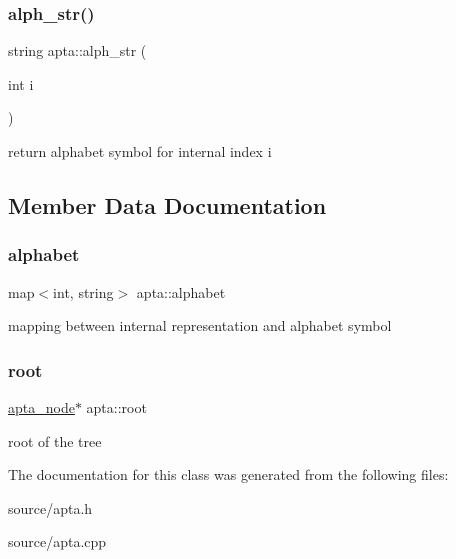 \subsubsection{\texorpdfstring{alph\+\_\+str()}{alph\_str()}}
{\footnotesize\ttfamily string apta\+::alph\+\_\+str (\begin{DoxyParamCaption}\item[{int}]{i }\end{DoxyParamCaption})}

return alphabet symbol for internal index i 

\subsection{Member Data Documentation}
\mbox{\label{classapta_a36490cd60aae771985948b4defdf6bcb}} 
\subsubsection{\texorpdfstring{alphabet}{alphabet}}
{\footnotesize\ttfamily map$<$int, string$>$ apta\+::alphabet}

mapping between internal representation and alphabet symbol \mbox{\label{classapta_a96e4359fad19dafce95f0a3086c44a73}} 
\subsubsection{\texorpdfstring{root}{root}}
{\footnotesize\ttfamily \hyperlink{classapta__node}{apta\+\_\+node}$\ast$ apta\+::root}

root of the tree 

The documentation for this class was generated from the following files\+:\begin{DoxyCompactItemize}
\item 
source/apta.\+h\item 
source/apta.\+cpp\end{DoxyCompactItemize}
